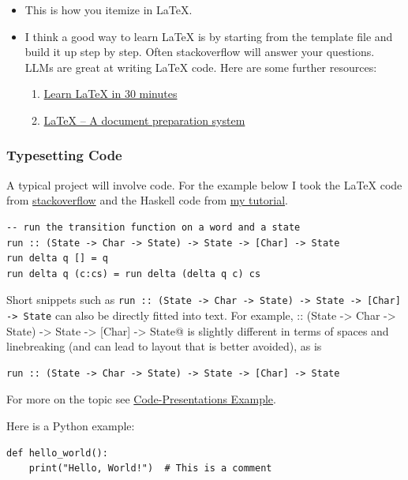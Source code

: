 \documentclass{article}
\theoremstyle{plain}
\theoremstyle{definition}
\theoremstyle{remark}
\begin{document}
\begin{itemize}
\item This is how you itemize in LaTeX.
\item I think a good way to learn LaTeX is by starting from the template file and build it up step by step. Often stackoverflow will answer your questions. LLMs are great at writing LaTeX code. Here are some further resources:
  \begin{enumerate}
  \item \href{https://www.overleaf.com/learn/latex/Learn_LaTeX_in_30_minutes}{Learn LaTeX in 30 minutes}
  \item \href{https://www.latex-project.org/}{LaTeX – A document preparation system}\end{enumerate}
\end{itemize}

\subsubsection{Typesetting Code}

A typical project will involve code. For the example below I took the LaTeX code from \href{https://stackoverflow.com/a/3175141/4600290}{stackoverflow} and the Haskell code from \href{https://hackmd.io/@alexhkurz/HylLKujCP}{my tutorial}.  

\lstset{language=haskell}
\begin{lstlisting}  
-- run the transition function on a word and a state
run :: (State -> Char -> State) -> State -> [Char] -> State
run delta q [] = q
run delta q (c:cs) = run delta (delta q c) cs 
\end{lstlisting}
%
Short snippets such as \texttt{run :: (State -> Char -> State) -> State -> [Char] -> State} can also be directly fitted into text. For example, \verb@run :: (State -> Char -> State) -> State -> [Char] -> State@ is slightly different in terms of spaces and linebreaking (and can lead to layout that is better avoided), as is
\begin{verbatim}run :: (State -> Char -> State) -> State -> [Char] -> State\end{verbatim}

For more on the topic see \href{https://www.overleaf.com/latex/examples/code-presentations-example-different-ways-shown-in-beamer-metropolis/tsxpnyjbhbds}{Code-Presentations Example}.

Here is a Python example:

\lstset{language=Python}
\begin{lstlisting}
def hello_world():
    print("Hello, World!")  # This is a comment
\end{lstlisting}
\end{document}
